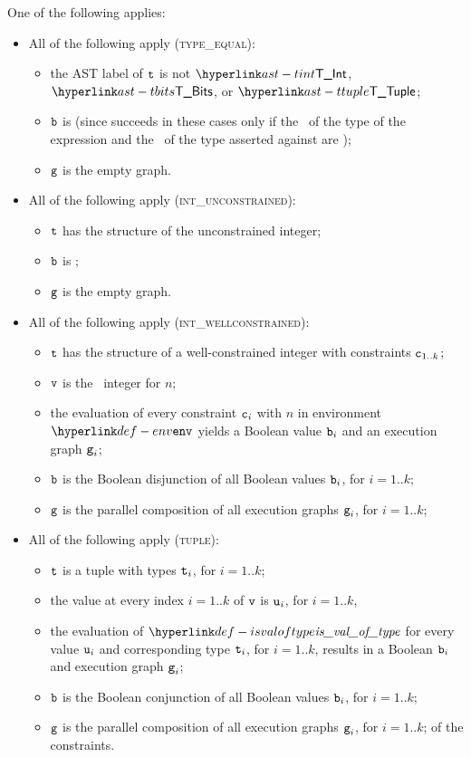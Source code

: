 One of the following applies:
\begin{itemize}
  \item All of the following apply (\textsc{type\_equal}):
  \begin{itemize}
    \item the AST label of $\texttt{t}$ is not $\TInt$, $\TBits$, or $\TTuple$;
    \item $\texttt{b}$ is \True (since 
    succeeds in these cases only if the \structure\ of the type of the expression and the \structure\ of the type asserted against are \typeequivalent);
    \item $\texttt{g}$ is the empty graph.
  \end{itemize}

  \item All of the following apply (\textsc{int\_unconstrained}):
  \begin{itemize}
    \item $\texttt{t}$ has the structure of the unconstrained integer;
    \item $\texttt{b}$ is \True;
    \item $\texttt{g}$ is the empty graph.
  \end{itemize}

  \item All of the following apply (\textsc{int\_wellconstrained}):
  \begin{itemize}
    \item $\texttt{t}$ has the structure of a well-constrained integer with constraints $\texttt{c}_{1..k}$;
    \item $\texttt{v}$ is the \nativevalue\  integer for $n$;
    \item the evaluation of every constraint $\texttt{c}_i$ with $n$ in environment $\env$
    yields a Boolean value $\texttt{b}_i$ and an execution graph $\texttt{g}_i$\ProseOrError;
    \item $\texttt{b}$ is the Boolean disjunction of all Boolean values $\texttt{b}_i$, for $i=1..k$;
    \item $\texttt{g}$ is the parallel composition of all execution graphs $\texttt{g}_i$, for $i=1..k$;
  \end{itemize}

  \item All of the following apply (\textsc{tuple}):
  \begin{itemize}
    \item $\texttt{t}$ is a tuple with types $\texttt{t}_i$, for $i=1..k$;
    \item the value at every index $i=1..k$ of $\texttt{v}$ is $\texttt{u}_i$, for $i=1..k$,
    \item the evaluation of $\isvaloftype$ for every value $\texttt{u}_i$
    and corresponding type $\texttt{t}_i$, for $i=1..k$,
    results in a Boolean $\texttt{b}_i$ and execution graph $\texttt{g}_i$\ProseOrError;
    \item $\texttt{b}$ is the Boolean conjunction of all Boolean values $\texttt{b}_i$, for $i=1..k$;
    \item $\texttt{g}$ is the parallel composition of all execution graphs $\texttt{g}_i$, for $i=1..k$;
    of the constraints.
  \end{itemize}
\end{itemize}
